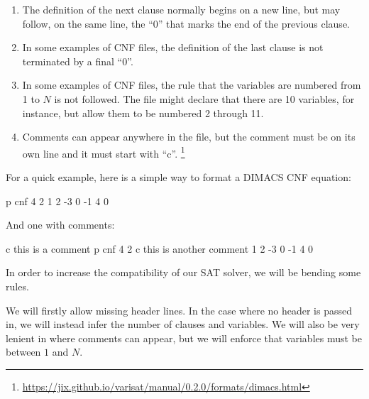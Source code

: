 \begin{enumerate}
    \item The definition of the next clause normally begins on a new line, but
    may follow, on the same line, the ``0'' that marks the end of the previous
    clause.

    \item In some examples of CNF files, the definition of the last clause is
    not terminated by a final ``0''.

    \item In some examples of CNF files, the rule that the variables are
    numbered from 1 to $N$ is not followed. The file might declare that there
    are 10 variables, for instance, but allow them to be numbered 2 through
    11.

    \item Comments can appear anywhere in the file, but the comment must be
    on its own line and it must start with ``c''.
    \footnote{\url{https://jix.github.io/varisat/manual/0.2.0/formats/dimacs.html}}
\end{enumerate}
For a quick example, here is a simple way to format a DIMACS CNF equation:

\begin{center}
  \begin{FVerbatim}
p cnf 4 2
1 2 -3 0
-1 4 0
  \end{FVerbatim}
\end{center}

And one with comments:

\begin{center}
  \begin{FVerbatim}
c this is a comment
p cnf 4 2
c this is another comment
1 2 -3 0
-1 4 0
  \end{FVerbatim}
\end{center}

In order to increase the compatibility of our SAT solver, we will be bending
some rules.

We will firstly allow missing header lines. In the case where no header is
passed in, we will instead infer the number of clauses and variables. We will
also be very lenient in where comments can appear, but we will enforce that
variables must be between $1$ and $N$.


